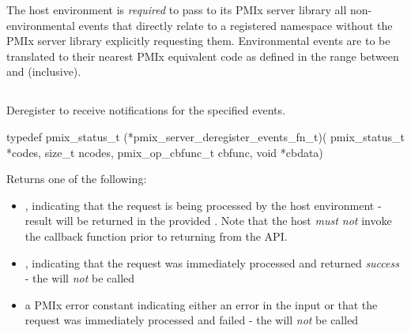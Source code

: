 \adviceimplend

\advicermstart
The host environment is \emph{required} to pass to its \ac{PMIx} server library all non-environmental events that directly relate to a registered namespace without the \ac{PMIx} server library explicitly requesting them. Environmental events are to be translated to their nearest \ac{PMIx} equivalent code as defined in the range between  and  (inclusive).
\advicermend


\subsection{}

\summary

Deregister to receive notifications for the specified events.

\format

\cspecificstart
\begin{codepar}
 typedef pmix_status_t (*pmix_server_deregister_events_fn_t)(
                              pmix_status_t *codes,
                              size_t ncodes,
                              pmix_op_cbfunc_t cbfunc,
                              void *cbdata)
\end{codepar}
\cspecificend

\begin{arglist}
\end{arglist}

Returns one of the following:

\begin{itemize}
    \item {}, indicating that the request is being processed by the host environment - result will be returned in the provided . Note that the host \emph{must not} invoke the callback function prior to returning from the \ac{API}.
    \item {}, indicating that the request was immediately processed and returned \textit{success} - the  will \textit{not} be called
    \item a PMIx error constant indicating either an error in the input or that the request was immediately processed and failed - the  will \textit{not} be called
\end{itemize}

